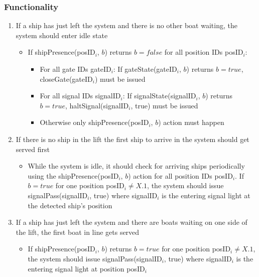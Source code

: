\subsubsection*{Functionality}
\begin{enumerate}
	\item If a ship has just left the system and there is no other boat waiting, the system should enter idle state
		\begin{itemize}
			\item If shipPresence(posID$_i$, $b$) returns $b = false$ for all position IDs posID$_i$:
			\begin{itemize}
				\item For all gate IDs gateID$_i$: If gateState(gateID$_i$, $b$) returns $b = true$, closeGate(gateID$_i$) must be issued
				\item For all signal IDs signalID$_i$: If signalState(signalID$_i$, $b$) returns $b = true$, haltSignal(signalID$_i$, true) must be issued
				\item Otherwise only shipPresence(posID$_i$, $b$) action must happen
			\end{itemize}
		\end{itemize}	
	
	\item If there is no ship in the lift the first ship to arrive in the system should get served first
		\begin{itemize}
			\item While the system is idle, it should check for arriving ships periodically using the shipPresence(posID$_i$, $b$) action for all position IDs posID$_i$. If $b = true$ for one position posID$_i \neq X.1$, the system should issue signalPass(signalID$_i$, true) where signalID$_i$ is the entering signal light at the detected ship's position
		\end{itemize}
	
	\item If a ship has just left the system and there are boats waiting on one side of the lift, the first boat in line gets served 
		\begin{itemize}
			\item If shipPresence(posID$_i$, $b$) returns $b = true$ for one position posID$_i \neq X.1$, the system should issue signalPass(signalID$_i$, true) where signalID$_i$ is the entering signal light at position posID$_i$
		\end{itemize}
		

\end{enumerate}
